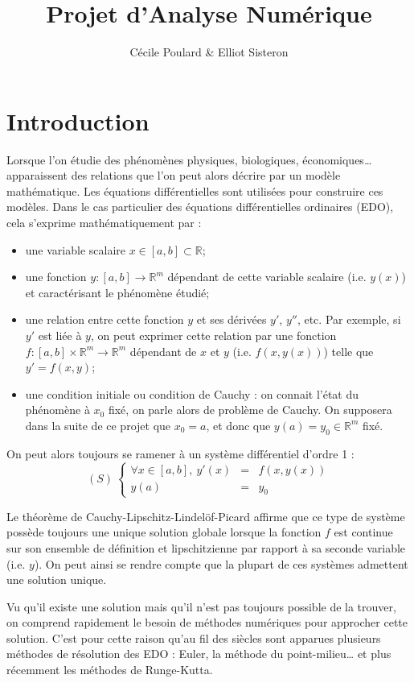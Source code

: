 \documentclass[a4paper, titlepage]{livret} %
\title{Projet d'Analyse Numérique} %
\author{Cécile Poulard & Elliot Sisteron} %
\begin{document}

	
	\chapter*{Introduction}
		Lorsque l'on étudie des phénomènes physiques, biologiques, économiques… apparaissent des relations que l'on peut alors décrire par un modèle mathématique.
		Les équations différentielles sont utilisées pour construire ces modèles.
		Dans le cas particulier des équations différentielles ordinaires (EDO), cela s'exprime mathématiquement par :
		\begin{itemize}
			\item une variable scalaire $x \in [a,b] \subset \mathbb{R}$;
			\item une fonction $y : [a,b] \to \mathbb{R}^{m}$ dépendant de cette variable scalaire (i.e. $y(x)$) et caractérisant le phénomène étudié;
			\item une relation entre cette fonction $y$ et ses dérivées $y'$, $y''$, etc. Par exemple, si $y'$ est liée à $y$, on peut exprimer cette relation par une fonction $f : [a,b] \times \mathbb{R}^{m} \to \mathbb{R}^{m}$ dépendant de $x$ et $y$ (i.e. $f(x,y(x))$) telle que $y' = f(x, y)$;
			\item une condition initiale ou condition de Cauchy : on connait l'état du phénomène à $x_{0}$ fixé, on parle alors de problème de Cauchy. On supposera dans la suite de ce projet que $x_{0} = a$, et donc que $y(a) = y_{0} \in \mathbb{R}^{m}$ fixé. 
		\end{itemize}
		On peut alors toujours se ramener à un système différentiel d'ordre 1 :
		\[(S) \
		\left\{
			\begin{array}{rcl}
				\forall x \in [a,b], \ y'(x) & = & f(x, y(x)) \\
				y(a) & = & y_{0}
			\end{array}
		\right.
		\]

		Le théorème de Cauchy-Lipschitz-Lindelöf-Picard affirme que ce type de système possède toujours une unique solution globale lorsque la fonction $f$ est continue sur son ensemble de définition et lipschitzienne par rapport à sa seconde variable (i.e. $y$).
		On peut ainsi se rendre compte que la plupart de ces systèmes admettent une solution unique.

		Vu qu'il existe une solution mais qu'il n'est pas toujours possible de la trouver, on comprend rapidement le besoin de méthodes numériques pour approcher cette solution.
		C'est pour cette raison qu'au fil des siècles sont apparues plusieurs méthodes de résolution des EDO : Euler, la méthode du point-milieu… et plus récemment les méthodes de Runge-Kutta.
\end{document}

